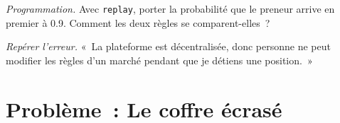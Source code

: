 \begin{exercise}[$\star\star\star$]\label{exo:m3:on-chain-order-books-and-perpetual-dexs:7}
\emph{Programmation.} Avec \texttt{replay}, porter la probabilité que le preneur arrive en premier à 0.9. Comment les deux règles se comparent-elles~?
\end{exercise}

\begin{exercise}[$\star\star\star$]\label{exo:m3:on-chain-order-books-and-perpetual-dexs:8}
\emph{Repérer l'erreur.} «~La plateforme est décentralisée, donc personne ne peut modifier les règles d'un marché pendant que je détiens une position.~»
\end{exercise}

\section{Problème~: Le coffre écrasé}

